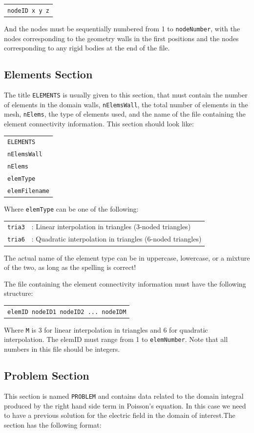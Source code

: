 \documentclass[12pt]{article}
\begin{document}
\begin{tabular}{l}
\texttt{nodeID x y z}
\end{tabular}

And the nodes must be sequentially numbered from 1 to \verb+nodeNumber+, with the nodes corresponding to the geometry walls in the first positions and the nodes corresponding to any rigid bodies at the end of the file.

\subsection{Elements Section}
The title \verb+ELEMENTS+ is usually given to this section, that must contain the number of elements in the domain walls, \verb+nElemsWall+, the total number of elements in the mesh, \verb+nElems+, the type of elements used, and the name of the file containing the element connectivity information. This section should look like:

\begin{tabular}{l}
\texttt{ELEMENTS}\\
\texttt{nElemsWall}\\
\texttt{nElems}\\
\texttt{elemType}\\
\texttt{elemFilename}
\end{tabular}

Where \verb+elemType+ can be one of the following:

\begin{tabular}{ll}
\texttt{tria3}&: Linear interpolation in triangles (3-noded triangles)\\
\texttt{tria6}&: Quadratic interpolation in triangles (6-noded triangles)
\end{tabular}

The actual name of the element type can be in uppercase, lowercase, or a mixture of the two, as long as the spelling is correct!

The file containing the element connectivity information must have the following structure:

\begin{tabular}{l}
\texttt{elemID nodeID1 nodeID2	... nodeIDM}
\end{tabular}

Where \verb+M+ is 3 for linear interpolation in triangles and 6 for quadratic interpolation. The elemID must range from 1 to \verb+elemNumber+. Note that all numbers in this file should be integers.

\subsection{Problem Section}
This section is named \verb+PROBLEM+ and contains data related to the domain integral produced by the right hand side term in Poisson's equation. In this case we need to have a previous solution for the electric field in the domain of interest.The section has the following format:
\end{document}
